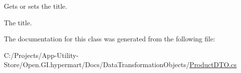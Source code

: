 Gets or sets the title. 

The title. 

The documentation for this class was generated from the following file\+:\begin{DoxyCompactItemize}
\item 
C\+:/\+Projects/\+App-\/\+Utility-\/\+Store/\+Open.\+G\+I.\+hypermart/\+Docs/\+Data\+Transformation\+Objects/\hyperlink{_product_d_t_o_8cs}{Product\+D\+T\+O.\+cs}\end{DoxyCompactItemize}

